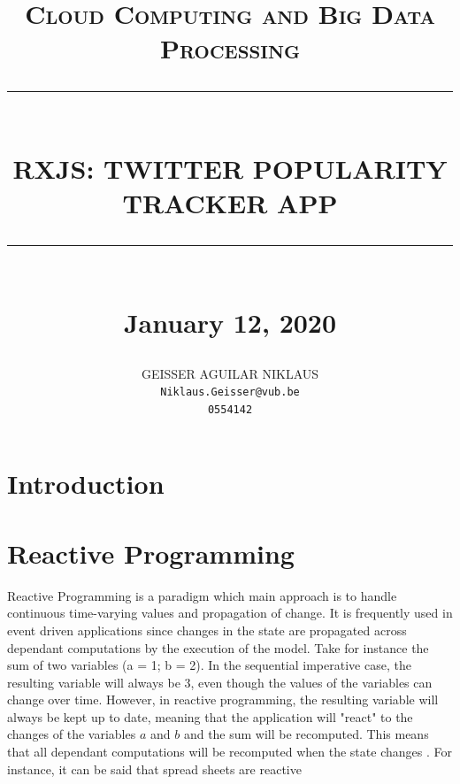 \documentclass[12pt]{report}
\newcommand{\HRule}[1]{\rule{\linewidth}{#1}}
\begin{document}
\title{ \normalsize \textsc{Cloud Computing and Big Data Processing}
		\\ [2.0cm]
		\HRule{0.5pt} \\
		\LARGE \textbf{\uppercase{RxJS: Twitter popularity tracker app }}
		\HRule{2pt} \\ [0.5cm]
		\normalsize January 12, 2020 \vspace*{5\baselineskip}}

\date{}

\author{
  GEISSER AGUILAR NIKLAUS\\
  \texttt{Niklaus.Geisser@vub.be}\\
  \texttt{0554142}
}

\maketitle
\tableofcontents
\newpage

\sectionfont{\scshape}

\section{Introduction}


\section{Reactive Programming}
Reactive Programming is a paradigm which main approach is to handle continuous time-varying values and propagation of change. It is frequently used in event driven applications since changes in the state are propagated across dependant computations by the execution of the model. Take for instance the sum of two variables (a = 1; b = 2). In the sequential imperative case, the resulting variable will always be 3, even though the values of the variables can change over time. However, in reactive programming, the resulting variable will always be kept up to date, meaning that the application will "react" to the changes of the variables $a$ and $b$ and the sum will be recomputed. This means that all dependant computations will be recomputed when the state changes \cite{BainomugishaEngineer2013Asor}. For instance, it can be said that spread sheets are reactive
\end{document}
